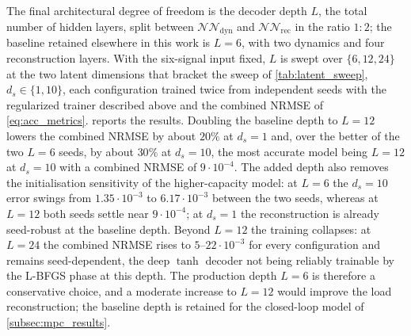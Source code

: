 
The final architectural degree of freedom is the decoder depth $L$, the
total number of hidden layers, split between $\mathcal{NN}_\mathrm{dyn}$ and
$\mathcal{NN}_\mathrm{rec}$ in the ratio $1{:}2$; the baseline retained
elsewhere in this work is $L=6$, with two dynamics and four reconstruction
layers. With the six-signal input fixed, $L$ is swept over $\{6,12,24\}$ at
the two latent dimensions that bracket the sweep of \cref{tab:latent_sweep},
$d_s\in\{1,10\}$, each configuration trained twice from independent seeds with
the regularized trainer described above and the combined NRMSE of
\cref{eq:acc_metrics}.  reports the results. Doubling the
baseline depth to $L=12$ lowers the combined NRMSE by about $20\%$ at $d_s=1$
and, over the better of the two $L=6$ seeds, by about $30\%$ at $d_s=10$, the
most accurate model being $L=12$ at $d_s=10$ with a combined NRMSE of
$9\cdot10^{-4}$. The added depth also removes the initialisation sensitivity of
the higher-capacity model: at $L=6$ the $d_s=10$ error swings from
$1.35\cdot10^{-3}$ to $6.17\cdot10^{-3}$ between the two seeds, whereas at
$L=12$ both seeds settle near $9\cdot10^{-4}$; at $d_s=1$ the reconstruction is
already seed-robust at the baseline depth. Beyond $L=12$ the training
collapses: at $L=24$ the combined NRMSE rises to $5$--$22\cdot10^{-3}$ for every
configuration and remains seed-dependent, the deep $\tanh$ decoder not being
reliably trainable by the L-BFGS phase at this depth. The production depth
$L=6$ is therefore a conservative choice, and a moderate increase to $L=12$
would improve the load reconstruction; the baseline depth is retained for the
closed-loop model of \cref{subsec:mpc_results}.

